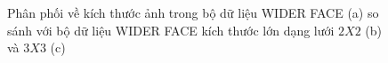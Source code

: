 {    %
    \begin{figure}[H]
        \centering
        \caption{Phân phối về kích thước ảnh trong bộ dữ liệu WIDER FACE \cite{yang2016wider} (a) so sánh với bộ dữ liệu WIDER FACE kích thước lớn dạng lưới $2 X 2$ (b) và $3 X 3$ (c)}
        \label{fig:widerface_4k_img_size}
    \end{figure}

}
